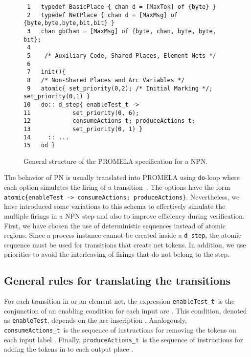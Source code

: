 \documentclass{llncs}
\begin{document}
\mfont
\begin{figure}
\begin{center}
\begin{verbatim}
 1   typedef BasicPlace { chan d = [MaxTok] of {byte} }
 2   typedef NetPlace { chan d = [MaxMsg] of {byte,byte,byte,bit,bit} }
 3   chan gbChan = [MaxMsg] of {byte, chan, byte, byte, bit};
 4
 5    /* Auxiliary Code, Shared Places, Element Nets */
 6
 7   init(){
 8   /* Non-Shared Places and Arc Variables */
 9   atomic{ set_priority(0,2); /* Initial Marking */; set_priority(0,1) }
10   do:: d_step{ enableTest_t ->
11            set_priority(0, 6);
12            consumeActions_t; produceActions_t;
13            set_priority(0, 1) }
14     :: ...
15   od }
\end{verbatim}
\end{center}
\vspace{-5pt}
\caption{General structure of the PROMELA specification for a NPN.}
\label{figStructSN}
\end{figure}
\nfont


The behavior of PN is usually translated into PROMELA using \small\verb"do"\nfont-loop where each option simulates the firing of a transition~\cite{spin}. The options have the form\\  \small\verb"atomic{enableTest -> consumeActions; produceActions}"\nfont. Nevertheless, we have introduced some variations to this schema to effectively simulate the multiple firings in a NPN step and also to improve efficiency during verification. First, we have chosen the use of deterministic sequences instead of atomic regions. Since a process instance cannot be created inside a \small\verb"d_step"\nfont, the atomic sequence must be used for transitions that create net tokens. In addition, we use priorities to avoid the interleaving of firings that do not belong to the step.


\subsection{General rules for translating the transitions}

For each transition  in  or an element net, the expression \small\verb"enableTest_t"\nfont\  is the conjunction of an enabling condition for each input arc . This condition, denoted as \small\verb"enableTest"\nfont, depends on the arc inscription . Analogously, \small\verb"consumeActions_t"\nfont\ is the sequence of instructions for removing the tokens on each input label . Finally, \small\verb"produceActions_t"\nfont\ is the sequence of instructions for adding the tokens in  to each output place .
\end{document}
